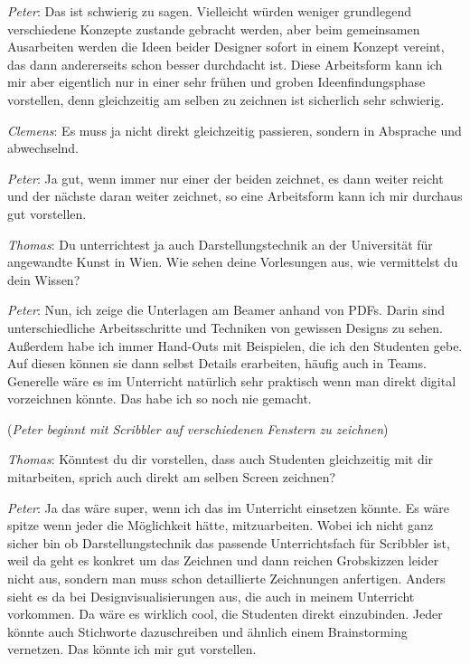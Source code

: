\medskip \emph{Peter}: Das ist schwierig zu sagen. Vielleicht würden weniger grundlegend verschiedene Konzepte zustande gebracht werden, aber beim gemeinsamen Ausarbeiten werden die Ideen beider Designer sofort in einem Konzept vereint, das dann andererseits schon besser durchdacht ist. Diese Arbeitsform kann ich mir aber eigentlich nur in einer sehr frühen und groben Ideenfindungsphase vorstellen, denn gleichzeitig am selben zu zeichnen ist sicherlich sehr schwierig.

\medskip \emph{Clemens}: Es muss ja nicht direkt gleichzeitig passieren, sondern in Absprache und abwechselnd.

\medskip \emph{Peter}: Ja gut, wenn immer nur einer der beiden zeichnet, es dann weiter reicht und der nächste daran weiter zeichnet, so eine Arbeitsform kann ich mir durchaus gut vorstellen.

\medskip \emph{Thomas}: Du unterrichtest ja auch Darstellungstechnik an der Universität für angewandte Kunst in Wien. Wie sehen deine Vorlesungen aus, wie vermittelst du dein Wissen?

\medskip \emph{Peter}: Nun, ich zeige die Unterlagen am Beamer anhand von \acp{PDF}. Darin sind unterschiedliche Arbeitsschritte und Techniken von gewissen Designs zu sehen. Außerdem habe ich immer Hand-Outs mit Beispielen, die ich den Studenten gebe. Auf diesen können sie dann selbst Details erarbeiten, häufig auch in Teams. Generelle wäre es im Unterricht natürlich sehr praktisch wenn man direkt digital vorzeichnen könnte. Das habe ich so noch nie gemacht.

\medskip (\emph{Peter beginnt mit Scribbler auf verschiedenen Fenstern zu zeichnen})

\medskip \emph{Thomas}: Könntest du dir vorstellen, dass auch Studenten gleichzeitig mit dir mitarbeiten, sprich auch direkt am selben Screen zeichnen?

\medskip \emph{Peter}: Ja das wäre super, wenn ich das im Unterricht einsetzen könnte. Es wäre spitze wenn jeder die Möglichkeit hätte, mitzuarbeiten. Wobei ich nicht ganz sicher bin ob Darstellungstechnik das passende Unterrichtsfach für Scribbler ist, weil da geht es konkret um das Zeichnen und dann reichen Grobskizzen leider nicht aus, sondern man muss schon detaillierte Zeichnungen anfertigen. Anders sieht es da bei Designvisualisierungen aus, die auch in meinem Unterricht vorkommen. Da wäre es wirklich cool, die Studenten direkt einzubinden. Jeder könnte auch Stichworte dazuschreiben und ähnlich einem Brainstorming vernetzen. Das könnte ich mir gut vorstellen. 

